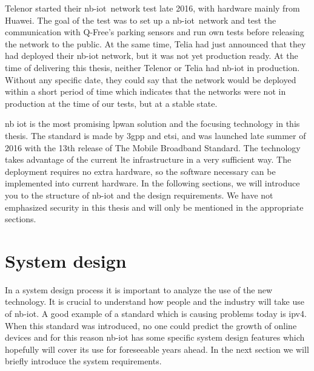 \documentclass[USenglish]{ifimaster}  %
\begin{document}
Telenor started their \acrshort{nb-iot} network test late 2016, with hardware mainly from Huawei. The goal of the test was to set up a \acrshort{nb-iot} network and test the communication with Q-Free's parking sensors and run own tests before releasing the network to the public. At the same time, Telia had just announced that they had deployed their \acrshort{nb-iot} network, but it was not yet production ready. At the time of delivering this thesis, neither Telenor or Telia had \acrshort{nb-iot} in production. Without any specific date, they could say that the network would be deployed within a short period of time which indicates that the networks were not in production at the time of our tests, but at a stable state.

\acrfull{nb} \acrfull{iot} is the most promising \acrshort{lpwan} solution and the focusing technology in this thesis. The standard is made by \acrfull{3gpp} and \acrfull{etsi}, and was launched late summer of 2016 with the 13th release of The Mobile Broadband Standard. The technology takes advantage of the current \acrshort{lte} infrastructure in a very sufficient way. The deployment requires no extra hardware, so the software necessary can be implemented into current hardware. In the following sections, we will introduce you to the structure of \acrshort{nb-iot} and the design requirements. We have not emphasized security in this thesis and will only be mentioned in the appropriate sections.

\section{System design}
In a system design process it is important to analyze the use of the new technology. It is crucial to understand how people and the industry will take use of \acrshort{nb-iot}. A good example of a standard which is causing problems today is \acrshort{ipv4}. When this standard was introduced, no one could predict the growth of online devices and for this reason \acrshort{nb-iot} has some specific system design features which hopefully will cover its use for foreseeable years ahead. In the next section we will briefly introduce the system requirements.
\end{document}
